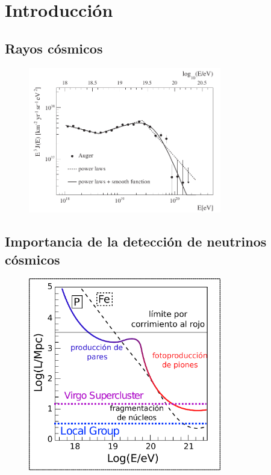 \chapter{Introducci\'on}
\label{ch:intro}

\section{Rayos c\'osmicos}


	\begin{figure}[ht]
		\begin{center}
		\includegraphics[width=0.75\textwidth]{fig/introduccion/spectrum_withGZK}
		\caption{\label{fig:specGZK} }
		\end{center}
	\end{figure}
	
	\section{Importancia de la detecci\'on de neutrinos c\'osmicos}

\begin{figure}[ht]
	\begin{center}
	\includegraphics[width=0.75\textwidth]{fig/introduccion/proton_propaga_espanol}
	\caption{\label{fig:protProp} }
	\end{center}
\end{figure}


